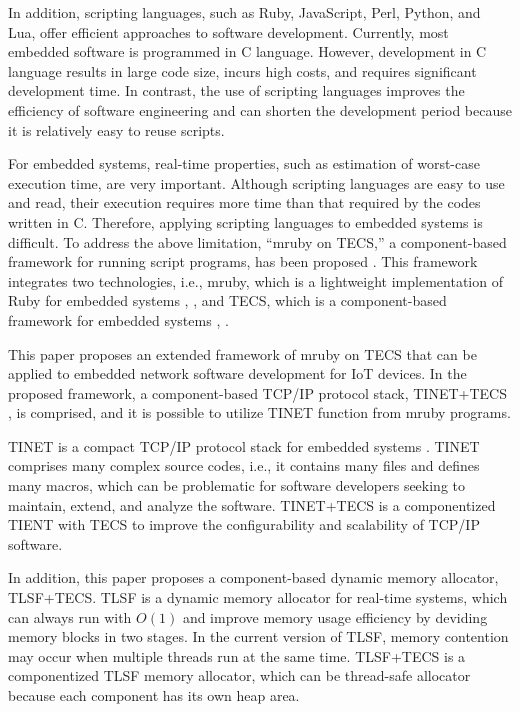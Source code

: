 \documentclass[JIP]{ipsj_v2/UTF8/ipsj}
\begin{document}
In addition, scripting languages, such as Ruby, JavaScript, Perl, Python, and Lua, offer efficient approaches to software development.
Currently, most embedded software is programmed in C language.
However, development in C language results in large code size, incurs high costs, and requires significant development time.
In contrast, the use of scripting languages improves the efficiency of software engineering and can shorten the development period because it is relatively easy to reuse scripts. 

For embedded systems, real-time properties, such as estimation of worst-case execution time, are very important.
Although scripting languages are easy to use and read, their execution requires more time than that required by the codes written in C.
Therefore, applying scripting languages to embedded systems is difficult.
To address the above limitation, ``mruby on TECS,'' a component-based framework for running script programs, has been proposed \cite{par:mrubyonTECS}.
This framework integrates two technologies, i.e., mruby, which is a lightweight implementation of Ruby for embedded systems \cite{par:mruby}, \cite{url:mruby}, and TECS, which is a component-based framework for embedded systems \cite{par:TECS}, \cite{url:TOPPERS}.

This paper proposes an extended framework of mruby on TECS that can be applied to embedded network software development for IoT devices.
In the proposed framework, a component-based TCP/IP protocol stack, TINET+TECS \cite{par:TINET+TECS}, is comprised, and it is possible to utilize TINET function from mruby programs.

TINET is a compact TCP/IP protocol stack for embedded systems \cite{url:TINET}.
TINET comprises many complex source codes, i.e., it contains many files and defines many macros, which can be problematic for software developers seeking to maintain, extend, and analyze the software.
TINET+TECS is a componentized TIENT with TECS to improve the configurability and scalability of TCP/IP software.

In addition, this paper proposes a component-based dynamic memory allocator, TLSF+TECS. 
TLSF is a dynamic memory allocator for real-time systems, which can always run with $O(1)$ and improve memory usage efficiency by deviding memory blocks in two stages.
In the current version of TLSF, memory contention may occur when multiple threads run at the same time.
TLSF+TECS is a componentized TLSF memory allocator, which can be thread-safe allocator because each component has its own heap area.
\end{document}

